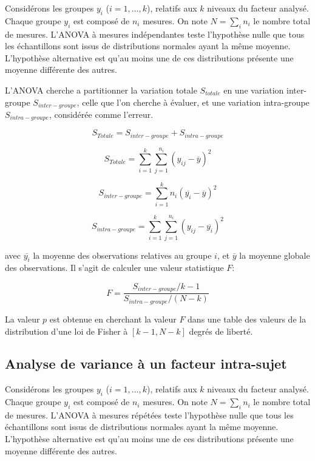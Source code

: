 Considérons les groupes $y_i$ ($i=1,\ldots,k$), relatifs aux $k$ niveaux du facteur analysé. Chaque groupe $y_i$ est composé de $n_i$ mesures. On note $N=\sum\limits_i n_i$ le nombre total de mesures. L'ANOVA à mesures indépendantes teste l'hypothèse nulle que tous les échantillons sont issus de distributions normales ayant la même moyenne. L'hypothèse alternative est qu'au moins une de ces distributions présente une moyenne différente des autres.

L'ANOVA cherche a partitionner la variation totale $S_{totale}$ en une variation inter-groupe $S_{inter-groupe}$, celle que l'on cherche à évaluer, et une variation intra-groupe $S_{intra-groupe}$, considérée comme l'erreur.

\begin{equation}
S_{Totale}= S_{inter-groupe} + S_{intra-groupe}
\end{equation}

\begin{equation}
S_{Totale}=\sum_{i=1}^k \sum_{j=1}^{n_i} (y_{ij}-\overline{y})^2
\end{equation}

\begin{equation}
S_{inter-groupe}=\sum_{i=1}^k n_i(\overline{y_i} - \overline{y})^2 
\end{equation}

\begin{equation}
S_{intra-groupe}=\sum_{i=1}^k \sum_{j=1}^{n_i} (y_{ij} - \overline{y_i})^2
\end{equation}


avec $\overline{y_i}$ la moyenne des observations relatives au groupe $i$, et $\overline{y}$ la moyenne globale des observations. Il s'agit de calculer une valeur statistique $F$:

\begin{equation}
F=\dfrac{S_{inter-groupe}/k-1}{S_{intra-groupe}/(N-k)}
\end{equation}

La valeur $p$ est obtenue en cherchant la valeur $F$ dans une table des valeurs de la distribution d'une loi de Fisher à $[k-1,N-k]$ degrés de liberté.

\subsection*{Analyse de variance à un facteur intra-sujet}

Considérons les groupes $y_i$ ($i=1,\ldots,k$), relatifs aux $k$ niveaux du facteur analysé. Chaque groupe $y_i$ est composé de $n_i$ mesures. On note $N=\sum\limits_i n_i$ le nombre total de mesures. L'ANOVA à mesures répétées teste l'hypothèse nulle que tous les échantillons sont issus de distributions normales ayant la même moyenne. L'hypothèse alternative est qu'au moins une de ces distributions présente une moyenne différente des autres.

